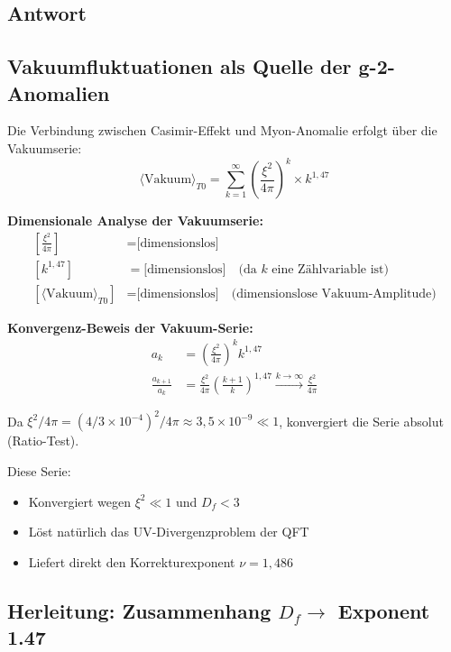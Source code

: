 \documentclass[12pt,a4paper]{article}
\newcommand{\nulep}{\nu}
\theoremstyle{remark}
\newenvironment{answer}{\subsection*{Antwort}}{\vspace{1em}}
\begin{document}
\begin{answer}
	\subsection{Vakuumfluktuationen als Quelle der g-2-Anomalien}
	
	Die Verbindung zwischen Casimir-Effekt und Myon-Anomalie erfolgt über die Vakuumserie:
	\begin{equation}
		\langle \text{Vakuum} \rangle_{T0} = \sum_{k=1}^{\infty} \left(\frac{\xi^2}{4\pi}\right)^k \times k^{1{,}47}
	\end{equation}
	
	\begin{units}
		\textbf{Dimensionale Analyse der Vakuumserie:}
		\begin{align}
			\left[\frac{\xi^2}{4\pi}\right] &= \text{[dimensionslos]} \\
			[k^{1{,}47}] &= \text{[dimensionslos]} \quad \text{(da } k \text{ eine Zählvariable ist)} \\
			[\langle \text{Vakuum} \rangle_{T0}] &= \text{[dimensionslos]} \quad \text{(dimensionslose Vakuum-Amplitude)}
		\end{align}
	\end{units}
	
	\textbf{Konvergenz-Beweis der Vakuum-Serie:}
	\begin{align}
		a_k &= \left(\frac{\xi^2}{4\pi}\right)^k k^{1{,}47} \\
		\frac{a_{k+1}}{a_k} &= \frac{\xi^2}{4\pi} \left(\frac{k+1}{k}\right)^{1{,}47} \xrightarrow{k \to \infty} \frac{\xi^2}{4\pi}
	\end{align}
	
	Da $\xi^2/4\pi = (4/3 \times 10^{-4})^2/4\pi \approx 3{,}5 \times 10^{-9} \ll 1$, konvergiert die Serie absolut (Ratio-Test).
	
	Diese Serie:
	\begin{itemize}
		\item Konvergiert wegen $\xi^2 \ll 1$ und $D_f < 3$
		\item Löst natürlich das UV-Divergenzproblem der QFT
		\item Liefert direkt den Korrekturexponent $\nulep = 1{,}486$
	\end{itemize}
	
	\subsection{Herleitung: Zusammenhang \( D_f \to \) Exponent 1.47}
	

\end{answer}
\end{document}

